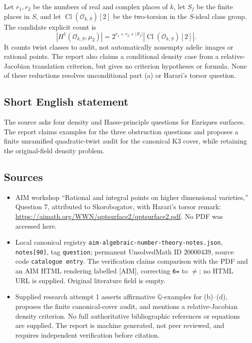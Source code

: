 \documentclass[11pt]{article}
\newcommand{\Q}{\mathbb{Q}}
\begin{document}
Let \(r_1,r_2\) be the numbers of real and complex places of \(k\), let \(S_f\) be the finite places in \(S\), and let \(\operatorname{Cl}(\mathcal O_{k,S})[2]\) be the two-torsion in the \(S\)-ideal class group. The candidate explicit count is
\[
\left|H^1(\mathcal O_{k,S},\mu_2)\right|
=2^{r_1+r_2+|S_f|}\left|\operatorname{Cl}(\mathcal O_{k,S})[2]\right|.
\]
It counts twist classes to audit, not automatically nonempty adelic images or rational points. The report also claims a conditional density case from a relative-Jacobian translation criterion, but gives no criterion hypotheses or formula. None of these reductions resolves unconditional part (a) or Harari's torsor question.
\subsection{Short English statement}
The source asks four density and Hasse-principle questions for Enriques surfaces. The report claims examples for the three obstruction questions and proposes a finite unramified quadratic-twist audit for the canonical K3 cover, while retaining the original-field density problem.
\subsection{Sources}
\begin{itemize}
\item AIM workshop ``Rational and integral points on higher dimensional varieties,'' Question 7, attributed to Skorobogatov, with Harari's torsor remark: \url{https://aimath.org/WWN/qptsurface2/qptsurface2.pdf}. No PDF was accessed here.
\item Local canonical registry \texttt{aim-algebraic-number-theory-notes.json}, \texttt{notes[90]}, tag \texttt{question}; permanent UnsolvedMath ID \(20000439\), source code \texttt{catalogue entry}. The verification claims comparison with the PDF and an AIM HTML rendering labelled [AIM], correcting \texttt{6=} to \(\ne\); no HTML URL is supplied. Original literature field is empty.
\item Supplied research attempt 1 asserts affirmative \(\Q\)-examples for (b)--(d), proposes the finite canonical-cover audit, and mentions a relative-Jacobian density criterion. No full authoritative bibliographic references or equations are supplied. The report is machine generated, not peer reviewed, and requires independent verification before citation.
\end{itemize}
\end{document}
